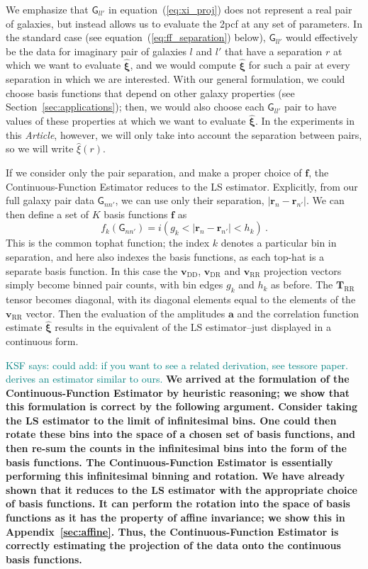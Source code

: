 \documentclass[modern]{aastex62}
\newcommand{\cf}{2pcf\xspace}
\newcommand{\Est}{The Continuous-Function Estimator\xspace}
\newcommand{\est}{the Continuous-Function Estimator\xspace}
\newcommand{\documentname}{\textsl{Article}\xspace}
\newcommand{\LS}{LS\xspace}
\newcommand{\eqt}[1]{equation~(\ref{#1})}
\newcommand{\bld}[1]{\bm{#1}}
\newcommand{\vv}[1]{\bld{v}_\mathrm{#1}}
\newcommand{\TT}[1]{\bld{T}_\mathrm{#1}}
\newcommand{\ff}{\bld{f}}
\newcommand{\GG}[1]{\mathsf{G}_{#1}}
\newcommand{\KSF}[1]{\textcolor{teal}{KSF says: #1}}
\newcommand{\new}[1]{\textbf{#1}}
\begin{document}
We emphasize that $\GG{ll'}$ in \eqt{eq:xi_proj} does not represent a real pair of galaxies, but instead allows us to evaluate the \cf at any set of parameters.
In the standard case (see \eqt{eq:ff_separation} below), $\GG{ll'}$ would effectively be the data for imaginary pair of galaxies $l$ and $l'$ that have a separation $r$ at which we want to evaluate $\bld{\hat{\xi}}$, and we would compute $\bld{\hat{\xi}}$ for such a pair at every separation in which we are interested.
With our general formulation, we could choose basis functions that depend on other galaxy properties (see Section~\ref{sec:applications}); then, we would also choose each $\GG{ll'}$ pair to have values of these properties at which we want to evaluate $\bld{\hat{\xi}}$.
In the experiments in this \documentname, however, we will only take into account the separation between pairs, so we will write $\hat{\xi}(r)$.

If we consider only the pair separation, and make a proper choice of $\ff$, \est reduces to the \LS estimator.
Explicitly, from our full galaxy pair data $\GG{n n'}$, we can use only their separation,  $|\bld{r}_n - \bld{r}_{n'}|$.
We can then define a set of $K$ basis functions $\ff$ as
\begin{equation}
    \label{eq:ff_separation}
    f_k(\GG{n n'}) =  i(g_k < |\bld{r}_n - \bld{r}_{n'}| < h_k) ~.
\end{equation}
This is the common tophat function; the index $k$ denotes a particular bin in separation, and here also indexes the basis functions, as each top-hat is a separate basis function.
In this case the $\vv{DD}$, $\vv{DR}$ and $\vv{RR}$ projection vectors simply become binned pair counts, with bin edges $g_k$ and $h_k$ as before.
The $\TT{RR}$ tensor becomes diagonal, with its diagonal elements equal to the elements of the $\vv{RR}$ vector.
Then the evaluation of the amplitudes $\bld{a}$ and the correlation function estimate $\bld{\hat{\xi}}$ results in the equivalent of the \LS estimator--just displayed in a continuous form.

\KSF{could add: if you want to see a related derivation, see tessore paper. derives an estimator similar to ours.}
\new{We arrived at the formulation of \est by heuristic reasoning; we show that this formulation is correct by the following argument. 
Consider taking the \LS estimator to the limit of infinitesimal bins.
One could then rotate these bins into the space of a chosen set of basis functions, and then re-sum the counts in the infinitesimal bins into the form of the basis functions.
\Est is essentially performing this infinitesimal binning and rotation.
We have already shown that it reduces to the \LS estimator with the appropriate choice of basis functions.
It can perform the rotation into the space of basis functions as it has the property of affine invariance; we show this in Appendix~\ref{sec:affine}.
Thus, \est is correctly estimating the projection of the data onto the continuous basis functions.}
 
\end{document}
